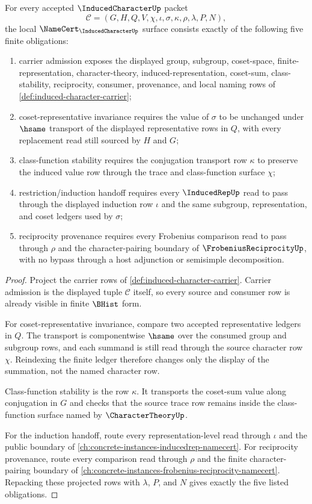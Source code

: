 \begin{theorem}
\label{thm:induced-character-namecert-obligations}
For every accepted $\InducedCharacterUp$ packet
$$
\mathcal{C}=(G,H,Q,V,\chi,\iota,\sigma,\kappa,\rho,\lambda,P,N),
$$
the local $\NameCert_{\InducedCharacterUp}$ surface consists exactly of the following five finite obligations:
\begin{enumerate}
\item carrier admission exposes the displayed group, subgroup, coset-space, finite-representation, character-theory, induced-representation, coset-sum, class-stability, reciprocity, consumer, provenance, and local naming rows of \autoref{def:induced-character-carrier};
\item coset-representative invariance requires the value of $\sigma$ to be unchanged under $\hsame$ transport of the displayed representative rows in $Q$, with every replacement read still sourced by $H$ and $G$;
\item class-function stability requires the conjugation transport row $\kappa$ to preserve the induced value row through the trace and class-function surface $\chi$;
\item restriction/induction handoff requires every $\InducedRepUp$ read to pass through the displayed induction row $\iota$ and the same subgroup, representation, and coset ledgers used by $\sigma$;
\item reciprocity provenance requires every Frobenius comparison read to pass through $\rho$ and the character-pairing boundary of $\FrobeniusReciprocityUp$, with no bypass through a host adjunction or semisimple decomposition.
\end{enumerate}
\end{theorem}
\begin{proof}
Project the carrier rows of \autoref{def:induced-character-carrier}. Carrier admission is the displayed tuple $\mathcal{C}$ itself, so every source and consumer row is already visible in finite $\BHist$ form.

For coset-representative invariance, compare two accepted representative ledgers in $Q$. The transport is componentwise $\hsame$ over the consumed group and subgroup rows, and each summand is still read through the source character row $\chi$. Reindexing the finite ledger therefore changes only the display of the summation, not the named character row.

Class-function stability is the row $\kappa$. It transports the coset-sum value along conjugation in $G$ and checks that the source trace row remains inside the class-function surface named by $\CharacterTheoryUp$.

For the induction handoff, route every representation-level read through $\iota$ and the public boundary of \autoref{ch:concrete-instances-inducedrep-namecert}. For reciprocity provenance, route every comparison read through $\rho$ and the finite character-pairing boundary of \autoref{ch:concrete-instances-frobenius-reciprocity-namecert}. Repacking these projected rows with $\lambda$, $P$, and $N$ gives exactly the five listed obligations.
\end{proof}

